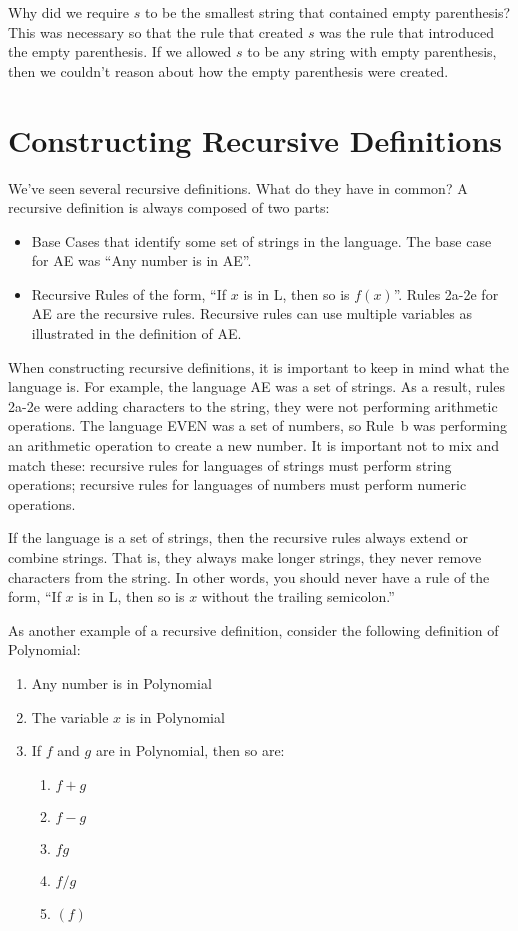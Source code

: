 \documentclass[letterpaper,12pt,openany,reqno]{book}%
\begin{document}
Why did we require $s$ to be the smallest string that contained empty parenthesis? This was necessary so that the rule that created $s$ was the rule that introduced the empty parenthesis. If we allowed $s$ to be any string with empty parenthesis, then we couldn't reason about how the empty parenthesis were created.
\section{Constructing Recursive Definitions}
We've seen several recursive definitions. What do they have in common? A recursive definition is always composed of two parts:
\begin{itemize}
\item Base Cases that identify some set of strings in the language. The base case for AE was ``Any number is in AE''.
\item Recursive Rules of the form, ``If $x$ is in L, then so is $f(x)$''. Rules 2a-2e for AE are the recursive rules. Recursive rules can use multiple variables as illustrated in the definition of AE.
\end{itemize}

When constructing recursive definitions, it is important to keep in mind what the language is. For example, the language AE was a set of strings. As a result, rules 2a-2e were adding characters to the string, they were not performing arithmetic operations. The language EVEN was a set of numbers, so Rule~b was performing an arithmetic operation to create a new number. It is important not to mix and match these: recursive rules for languages of strings must perform string operations; recursive rules for languages of numbers must perform numeric operations.

If the language is a set of strings, then the recursive rules always extend or combine strings. That is, they always make longer strings, they never remove characters from the string. In other words, you should never have a rule of the form, ``If $x$ is in L, then so is $x$ without the trailing semicolon.''

As another example of a recursive definition, consider the following definition of Polynomial:
\begin{enumerate}
\item Any number is in Polynomial
\item The variable $x$ is in Polynomial
\item If $f$ and $g$ are in Polynomial, then so are:
\begin{enumerate}
\item $f+g$
\item $f-g$
\item $f g$
\item $f/g$
\item $(f)$
\end{enumerate}
\end{enumerate}
\end{document}
